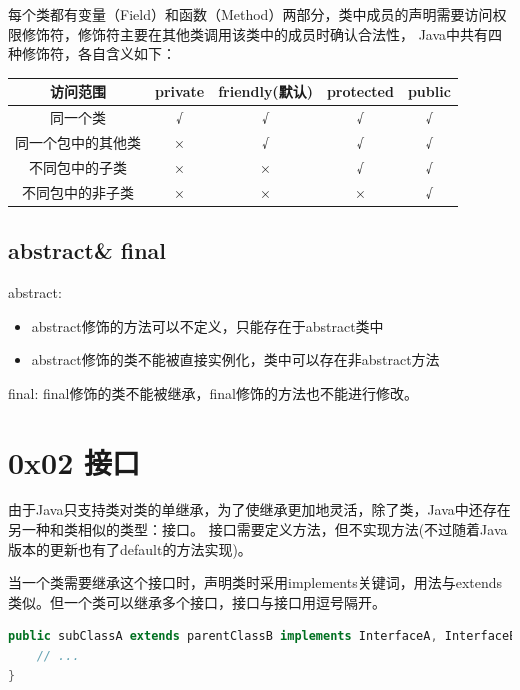 每个类都有变量（Field）和函数（Method）两部分，类中成员的声明需要访问权限修饰符，修饰符主要在其他类调用该类中的成员时确认合法性，
Java中共有四种修饰符，各自含义如下：
\begin{table}[H]
    \centering
    \begin{tabular}{|c|c|c|c|c|}
        \hline
        \textbf{访问范围} & \textbf{private} & \textbf{friendly(默认)} & \textbf{protected} & \textbf{public} \\ \hline
        同一个类          & √                & √                     & √                  & √               \\ \hline
        同一个包中的其他类     & ×                & √                     & √                  & √               \\ \hline
        不同包中的子类       & ×                & ×                     & √                  & √               \\ \hline
        不同包中的非子类      & ×                & ×                     & ×                  & √               \\ \hline
    \end{tabular}
\end{table}


\subsection{abstract\& final}
abstract: 
\begin{itemize}
    \item abstract修饰的方法可以不定义，只能存在于abstract类中
    \item abstract修饰的类不能被直接实例化，类中可以存在非abstract方法
\end{itemize}

final: final修饰的类不能被继承，final修饰的方法也不能进行修改。


\section{0x02 接口}

由于Java只支持类对类的单继承，为了使继承更加地灵活，除了类，Java中还存在另一种和类相似的类型：接口。
接口需要定义方法，但不实现方法(不过随着Java版本的更新也有了default的方法实现)。

当一个类需要继承这个接口时，声明类时采用implements关键词，用法与extends类似。但一个类可以继承多个接口，接口与接口用逗号隔开。
\begin{lstlisting}[language = Java]
public subClassA extends parentClassB implements InterfaceA, InterfaceB{
    // ... 
}
\end{lstlisting}

